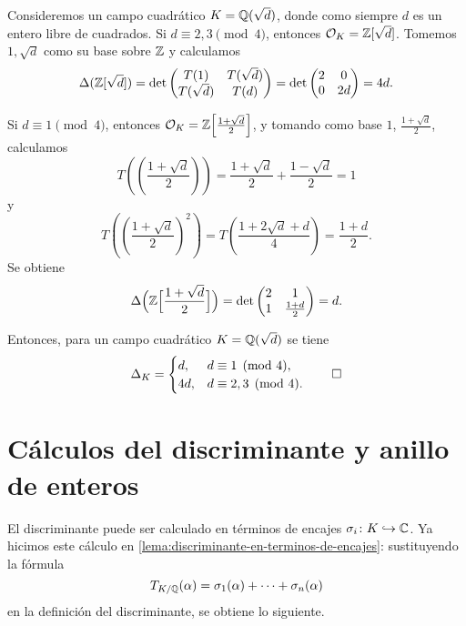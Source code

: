 \begin{ejemplo}
  Consideremos un campo cuadrático $K = \mathbb{Q} (\sqrt{d})$, donde como siempre $d$
  es un entero libre de cuadrados. Si $d \equiv 2,3\pmod{4}$, entonces
  $\mathcal{O}_K = \mathbb{Z} [\sqrt{d}]$. Tomemos $1, \sqrt{d}$ como su base sobre
  $\mathbb{Z}$ y calculamos
  \[ \Delta (\mathbb{Z} [\sqrt{d}]) = \det \begin{pmatrix}
    T (1) & T (\sqrt{d}) \\
    T (\sqrt{d}) & T (d)
  \end{pmatrix} = \det \begin{pmatrix}
    2 & 0 \\
    0 & 2d
  \end{pmatrix} = 4d. \]

  Si $d \equiv 1 \pmod{4}$, entonces
  $\mathcal{O}_K = \mathbb{Z} \Bigl[\frac{1+\sqrt{d}}{2}\Bigr]$, y tomando como base
  $1$, $\frac{1+\sqrt{d}}{2}$, calculamos
  \[ T \left(\left(\frac{1+\sqrt{d}}{2}\right)\right) =
     \frac{1+\sqrt{d}}{2} + \frac{1-\sqrt{d}}{2} = 1 \]
  y
  \[ T \left(\left(\frac{1+\sqrt{d}}{2}\right)^2\right) =
     T \left(\frac{1 + 2\sqrt{d} + d}{4}\right) = \frac{1+d}{2}. \]
  Se obtiene
  \[ \Delta \Bigl(\mathbb{Z}\Bigl[\frac{1+\sqrt{d}}{2}\Bigr]\Bigr) =
  \det \begin{pmatrix}
    2 & 1 \\
    1 & \frac{1+d}{2}
  \end{pmatrix} = d. \]

  Entonces, para un campo cuadrático $K = \mathbb{Q} (\sqrt{d})$ se tiene
  \[ \Delta_K = \begin{cases}
    d, & d \equiv 1 \pmod{4}, \\
    4d, & d \equiv 2,3 \pmod{4}.
  \end{cases} \qedhere \]
\end{ejemplo}


\section{Cálculos del discriminante y anillo de enteros}

El discriminante puede ser calculado en términos de encajes
$\sigma_i\colon K \hookrightarrow \mathbb{C}$. Ya hicimos este cálculo en
\ref{lema:discriminante-en-terminos-de-encajes}: sustituyendo la fórmula
$$T_{K/\mathbb{Q}} (\alpha) = \sigma_1 (\alpha) + \cdots + \sigma_n (\alpha)$$
en la definición del discriminante, se obtiene lo siguiente.

